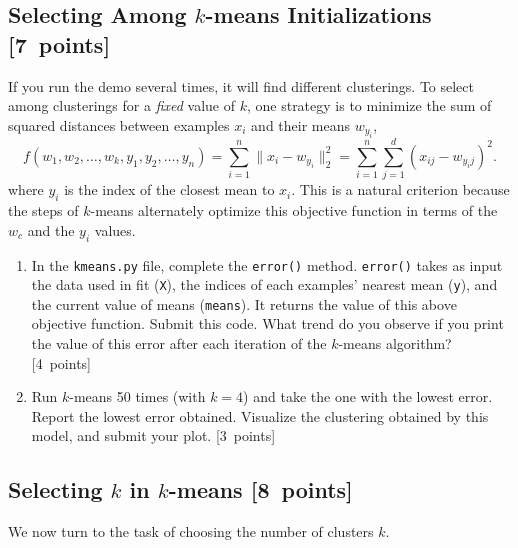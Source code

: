 \documentclass{article}
\newcommand{\blu}[1]{{\textcolor{blu}{#1}}}
\let\ask\blu
\newcommand\pts[1]{\textcolor{pointscolour}{[#1~points]}}
\newcommand{\norm}[1]{\lVert #1 \rVert}
\begin{document}
    \clearpage
    \subsection{Selecting Among $k$-means Initializations \pts{7}}

    If you run the demo several times, it will find different clusterings. To select among clusterings for a \emph{fixed} value of $k$, one strategy is to minimize the sum of squared distances between examples $x_i$ and their means $w_{y_i}$,
    \[
    f(w_1,w_2,\dots,w_k,y_1,y_2,\dots,y_n) = \sum_{i=1}^n \norm{x_i - w_{y_i}}_2^2 = \sum_{i=1}^n \sum_{j=1}^d (x_{ij} - w_{y_ij})^2.
    \]
    where $y_i$ is the index of the closest mean to $x_i$. This is a natural criterion because the steps of $k$-means alternately optimize this objective function in terms of the $w_c$ and the $y_i$ values.

    \begin{enumerate}
        \item In the \texttt{kmeans.py} file, complete the \texttt{error()} method. \texttt{error()} takes as input the data used in fit (\texttt{X}), the indices of each examples' nearest mean (\texttt{y}), and the current value of means (\texttt{means}). It returns the value of this above objective function. \ask{Submit this code. What trend do you observe if you print the value of this error after each iteration of the $k$-means algorithm?} \pts{4}
        
        \item Run $k$-means 50 times (with $k=4$) and take the one with the lowest error. \ask{Report the lowest error obtained.} Visualize the clustering obtained by this model, and \ask{submit your plot}. \pts{3}
    \end{enumerate}


    \clearpage
    \subsection{Selecting $k$ in $k$-means \pts{8}}

    We now turn to the task of choosing the number of clusters $k$.
\end{document}
